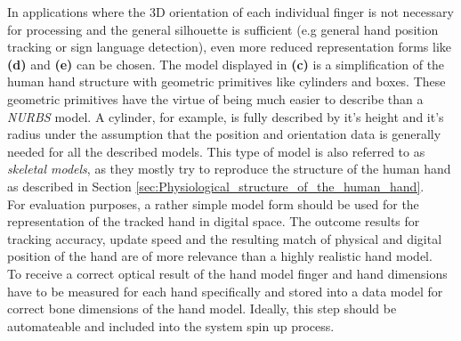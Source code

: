 In applications where the 3D orientation of each individual finger is not necessary for processing and the general silhouette is sufficient (e.g general hand position tracking or sign language detection), even more reduced representation forms like \textbf{(d)} and \textbf{(e)} can be chosen.
The model displayed in \textbf{(c)} is a simplification of the human hand structure with geometric primitives like cylinders and boxes. These geometric primitives have the virtue of being much easier to describe than a \textit{NURBS} model. A cylinder, for example, is fully described by it's height and it's radius under the assumption that the position and orientation data is generally needed for all the described models. This type of model is also referred to as \textit{skeletal models}, as they mostly try to reproduce the structure of the human hand as described in Section \ref{sec:Physiological_structure_of_the_human_hand}.\\
For evaluation purposes, a rather simple model form should be used for the representation of the tracked hand in digital space. The outcome results for tracking accuracy, update speed and the resulting match of physical and digital position of the hand are of more relevance than a highly realistic hand model.
\\To receive a correct optical result of the hand model finger and hand dimensions have to be measured for each hand specifically and stored into a data model for correct bone dimensions of the hand model. Ideally, this step should be automateable and included into the system spin up process.
 